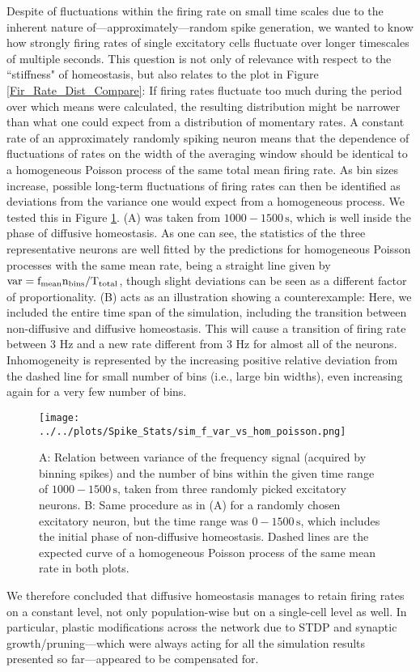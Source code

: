 \documentclass[10pt,a4paper]{article}
\begin{document}
Despite of fluctuations within the firing rate on small time scales due to the inherent nature of---approximately---random spike generation, we wanted to know how strongly firing rates of single excitatory cells fluctuate over longer timescales of multiple seconds. This question is not only of relevance with respect to the ``stiffness" of homeostasis, but also relates to the plot in Figure \ref{Fir_Rate_Dist_Compare}: If firing rates fluctuate too much during the period over which means were calculated, the resulting distribution might be narrower than what one could expect from a distribution of momentary rates. A constant rate of an approximately randomly spiking neuron means that the dependence of fluctuations of rates on the width of the averaging window should be identical to a homogeneous Poisson process of the same total mean firing rate. As bin sizes increase, possible long-term fluctuations of firing rates can then be identified as deviations from the variance one would expect from a homogeneous process. We tested this in Figure \ref{f_Var_vs_n_Bin}. (A) was taken from $\mathrm{1000-1500\,s}$, which is well inside the phase of diffusive homeostasis. As one can see, the statistics of the three representative neurons are well fitted by the predictions for homogeneous Poisson processes with the same mean rate, being a straight line given by $\mathrm{var = f_{\rm mean} n_{\rm bins}/T_{\rm total}}$, though slight deviations can be seen as a different factor of proportionality. (B) acts as an illustration showing a counterexample: Here, we included the entire time span of the simulation, including the transition between non-diffusive and diffusive homeostasis. This will cause a transition of firing rate between 3 Hz and a new rate different from 3 Hz for almost all of the neurons. Inhomogeneity is represented by the increasing positive relative deviation from the dashed line for small number of bins (i.e., large bin widths), even increasing again for a very few number of bins.
\begin{figure}
\texttt{[image: ../../plots/Spike\_Stats/sim\_f\_var\_vs\_hom\_poisson.png]}
\caption{A: Relation between variance of the frequency signal (acquired by binning spikes) and the number of bins within the given time range of $\mathrm{1000-1500\,s}$, taken from three randomly picked excitatory neurons. B: Same procedure as in (A) for a randomly chosen excitatory neuron, but the time range was $\mathrm{0-1500\,s}$, which includes the initial phase of non-diffusive homeostasis. Dashed lines are the expected curve of a homogeneous Poisson process of the same mean rate in both plots.}
\label{f_Var_vs_n_Bin}
\end{figure}
We therefore concluded that diffusive homeostasis manages to retain firing rates on a constant level, not only population-wise but on a single-cell level as well. In particular, plastic modifications across the network due to STDP and synaptic growth/pruning---which were always acting for all the simulation results presented so far---appeared to be compensated for.
\end{document}
